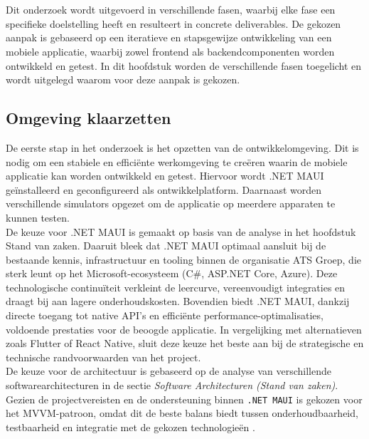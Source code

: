 
\chapter{}%
\label{ch:methodologie}

Dit onderzoek wordt uitgevoerd in verschillende fasen, waarbij elke fase een specifieke doelstelling heeft en resulteert in concrete deliverables. De gekozen aanpak is gebaseerd op een iteratieve en stapsgewijze ontwikkeling van een mobiele applicatie, waarbij zowel frontend als backendcomponenten worden ontwikkeld en getest. In dit hoofdstuk worden de verschillende fasen toegelicht en wordt uitgelegd waarom voor deze aanpak is gekozen.

\section{Omgeving klaarzetten}

De eerste stap in het onderzoek is het opzetten van de ontwikkelomgeving. Dit is nodig om een stabiele en efficiënte werkomgeving te creëren waarin de mobiele applicatie kan worden ontwikkeld en getest. Hiervoor wordt .NET MAUI geïnstalleerd en geconfigureerd als ontwikkelplatform. Daarnaast worden verschillende simulators opgezet om de applicatie op meerdere apparaten te kunnen testen.\\

De keuze voor .NET MAUI is gemaakt op basis van de analyse in het hoofdstuk Stand van zaken. Daaruit bleek dat .NET MAUI optimaal aansluit bij de bestaande kennis, infrastructuur en tooling binnen de organisatie ATS Groep, die sterk leunt op het Microsoft-ecosysteem (C#, ASP.NET Core, Azure). Deze technologische continuïteit verkleint de leercurve, vereenvoudigt integraties en draagt bij aan lagere onderhoudskosten. Bovendien biedt .NET MAUI, dankzij directe toegang tot native API’s en efficiënte performance-optimalisaties, voldoende prestaties voor de beoogde applicatie. In vergelijking met alternatieven zoals Flutter of React Native, sluit deze keuze het beste aan bij de strategische en technische randvoorwaarden van het project.\\

De keuze voor de architectuur is gebaseerd op de analyse van verschillende softwarearchitecturen in de sectie \emph{Software Architecturen (Stand van zaken)}. Gezien de projectvereisten en de ondersteuning binnen \texttt{.NET MAUI} is gekozen voor het MVVM-patroon, omdat dit de beste balans biedt tussen onderhoudbaarheid, testbaarheid en integratie met de gekozen technologieën \autocite{Lou2016}.\\

